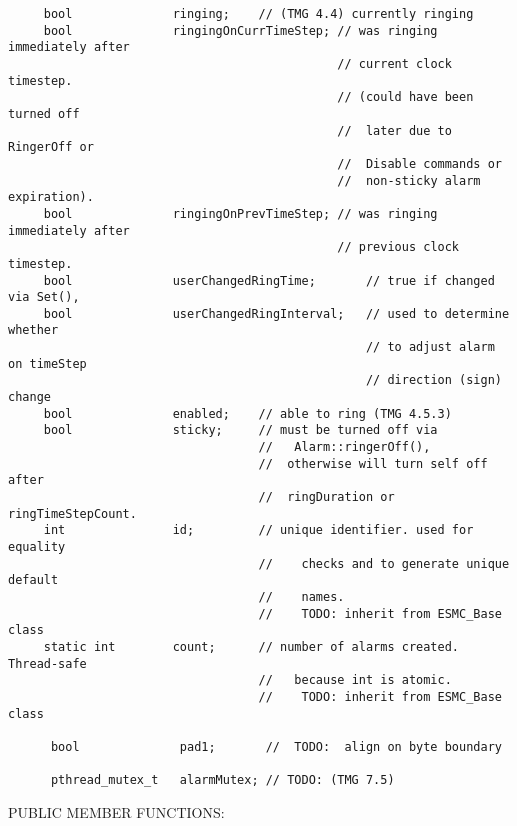 \begin{verbatim}
     bool              ringing;    // (TMG 4.4) currently ringing
     bool              ringingOnCurrTimeStep; // was ringing immediately after
                                              // current clock timestep.
                                              // (could have been turned off
                                              //  later due to RingerOff or
                                              //  Disable commands or
                                              //  non-sticky alarm expiration).
     bool              ringingOnPrevTimeStep; // was ringing immediately after
                                              // previous clock timestep.
     bool              userChangedRingTime;       // true if changed via Set(),
     bool              userChangedRingInterval;   // used to determine whether
                                                  // to adjust alarm on timeStep
                                                  // direction (sign) change
     bool              enabled;    // able to ring (TMG 4.5.3)
     bool              sticky;     // must be turned off via
                                   //   Alarm::ringerOff(),
                                   //  otherwise will turn self off after
                                   //  ringDuration or ringTimeStepCount.
     int               id;         // unique identifier. used for equality
                                   //    checks and to generate unique default
                                   //    names.
                                   //    TODO: inherit from ESMC_Base class
     static int        count;      // number of alarms created. Thread-safe
                                   //   because int is atomic.
                                   //    TODO: inherit from ESMC_Base class
 
      bool              pad1;       //  TODO:  align on byte boundary
 
      pthread_mutex_t   alarmMutex; // TODO: (TMG 7.5)
 \end{verbatim}{\sf PUBLIC MEMBER FUNCTIONS:}
